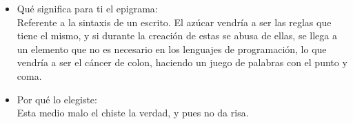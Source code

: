 \documentclass{article}
\begin{document}
\begin{itemize}
\begin{itemize}
        \item Qué significa para ti el epigrama:\\
        Referente a la sintaxis de un escrito. El azúcar vendría a ser las reglas que tiene el mismo, y si durante la creación de estas se abusa de ellas, se llega a un elemento que no es necesario en los lenguajes de programación, lo que vendría a ser el cáncer de colon, haciendo un juego de palabras con el punto y coma.
        \item Por qué lo elegiste:\\
        Esta medio malo el chiste la verdad, y pues no da risa.
    \end{itemize}
\end{itemize}
\end{document}
